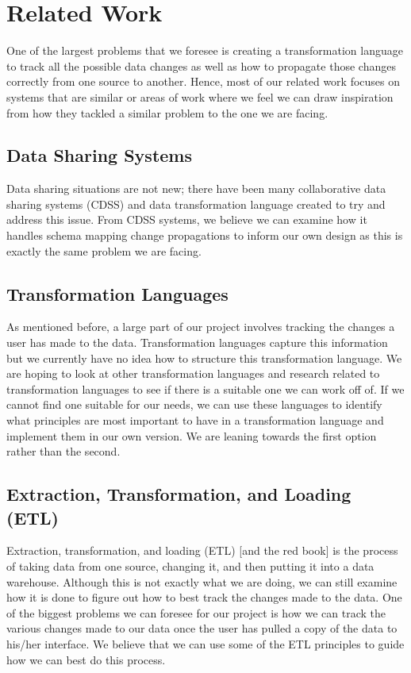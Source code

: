 \documentclass[12pt]{article}
\begin{document}
\section{Related Work}
One of the largest problems that we foresee is creating a transformation language to track all the possible data changes as well as how to propagate those changes correctly from one source to another. Hence, most of our related work focuses on systems that are similar or areas of work where we feel we can draw inspiration from how they tackled a similar problem to the one we are facing.

\subsection{Data Sharing Systems}
Data sharing situations are not new; there have been many collaborative data sharing systems (CDSS) \cite{ives2008orchestra, ives2005orchestra, karvounarakis2013collaborative}and data transformation language \cite{kandel2011wrangler, lakshmanan2001schemasql} created to try and address this issue. From CDSS systems, we believe we can examine how it handles schema mapping change propagations to inform our own design as this is exactly the same problem we are facing. 

\subsection{Transformation Languages}
As mentioned before, a large part of our project involves tracking the changes a user has made to the data. Transformation languages capture this information but we currently have no idea how to structure this transformation language. We are hoping to look at other transformation languages \cite{kandel2011wrangler, lakshmanan2001schemasql} and research related to transformation languages \cite{abiteboul1999tools, kandel2011wrangler, lakshmanan2001schemasql, raman2001potter} to see if there is a suitable one we can work off of. If we cannot find one suitable for our needs, we can use these languages to identify what principles are most important to have in a transformation language and implement them in our own version. We are leaning towards the first option rather than the second. 

\subsection{Extraction, Transformation, and Loading (ETL)}
Extraction, transformation, and loading (ETL) \cite{vassiliadis2009extraction}[and the red book] is the process of taking data from one source, changing it, and then putting it into a data warehouse. Although this is not exactly what we are doing, we can still examine how it is done to figure out how to best track the changes made to the data. One of the biggest problems we can foresee for our project is how we can track the various changes made to our data once the user has pulled a copy of the data to his/her interface. We believe that we can use some of the ETL principles to guide how we can best do this process.
\end{document}
